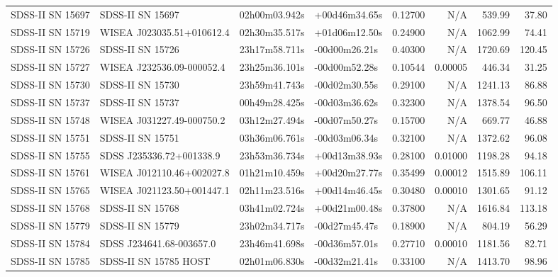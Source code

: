 \begin{longtable}{llllrrrr}
SDSS-II SN 15697 &                SDSS-II SN 15697 &   02h00m03.942s &   +00d46m34.65s &  0.12700 &      N/A &   539.99 &       37.80 \\
SDSS-II SN 15719 &       WISEA J023035.51+010612.4 &   02h30m35.517s &   +01d06m12.50s &  0.24900 &      N/A &  1062.99 &       74.41 \\
SDSS-II SN 15726 &                SDSS-II SN 15726 &   23h17m58.711s &   -00d00m26.21s &  0.40300 &      N/A &  1720.69 &      120.45 \\
SDSS-II SN 15727 &       WISEA J232536.09-000052.4 &   23h25m36.101s &   -00d00m52.28s &  0.10544 &  0.00005 &   446.34 &       31.25 \\
SDSS-II SN 15730 &                SDSS-II SN 15730 &   23h59m41.743s &   -00d02m30.55s &  0.29100 &      N/A &  1241.13 &       86.88 \\
SDSS-II SN 15737 &                SDSS-II SN 15737 &   00h49m28.425s &   -00d03m36.62s &  0.32300 &      N/A &  1378.54 &       96.50 \\
SDSS-II SN 15748 &       WISEA J031227.49-000750.2 &   03h12m27.494s &   -00d07m50.27s &  0.15700 &      N/A &   669.77 &       46.88 \\
SDSS-II SN 15751 &                SDSS-II SN 15751 &   03h36m06.761s &   -00d03m06.34s &  0.32100 &      N/A &  1372.62 &       96.08 \\
SDSS-II SN 15755 &        SDSS J235336.72+001338.9 &   23h53m36.734s &   +00d13m38.93s &  0.28100 &  0.01000 &  1198.28 &       94.18 \\
SDSS-II SN 15761 &       WISEA J012110.46+002027.8 &   01h21m10.459s &   +00d20m27.77s &  0.35499 &  0.00012 &  1515.89 &      106.11 \\
SDSS-II SN 15765 &       WISEA J021123.50+001447.1 &   02h11m23.516s &   +00d14m46.45s &  0.30480 &  0.00010 &  1301.65 &       91.12 \\
SDSS-II SN 15768 &                SDSS-II SN 15768 &   03h41m02.724s &   +00d21m00.48s &  0.37800 &      N/A &  1616.84 &      113.18 \\
SDSS-II SN 15779 &                SDSS-II SN 15779 &   23h02m34.717s &   -00d27m45.47s &  0.18900 &      N/A &   804.19 &       56.29 \\
SDSS-II SN 15784 &        SDSS J234641.68-003657.0 &   23h46m41.698s &   -00d36m57.01s &  0.27710 &  0.00010 &  1181.56 &       82.71 \\
SDSS-II SN 15785 &           SDSS-II SN 15785 HOST &   02h01m06.830s &   -00d32m21.41s &  0.33100 &      N/A &  1413.70 &       98.96 \\

\end{longtable}
